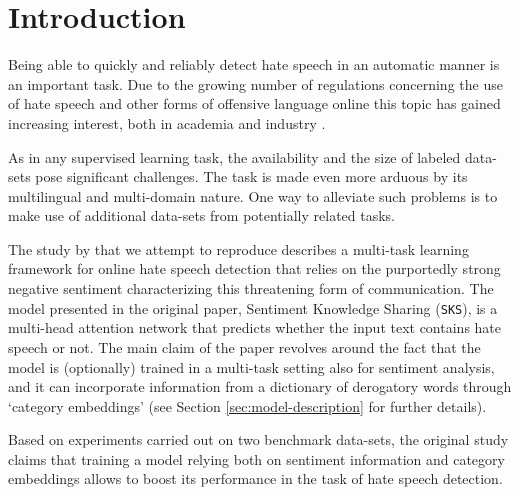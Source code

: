 \newpage



\section{Introduction}

Being able to quickly and reliably detect hate speech in an automatic manner is an important task.
Due to the growing number of regulations concerning the use of hate speech and other forms of offensive language online this topic has gained increasing interest, both in academia and industry \cite{davidson2017, Schmidt2017, basile:semeval, yin:arkaitz,zampieri2020}.

As in any supervised learning task, the availability and the size of labeled data-sets pose significant challenges. The task is made even more arduous by its multilingual and multi-domain nature. One way to alleviate such problems is to make use of additional data-sets from potentially related tasks.

The study by \citeauthor{original:zhou} that we attempt to reproduce describes a multi-task learning framework for online hate speech detection that relies on the purportedly strong negative sentiment characterizing this threatening form of communication. The model presented in the original paper, Sentiment Knowledge Sharing (\texttt{SKS}), is a multi-head attention network that predicts whether the input text contains hate speech or not. The main claim of the paper revolves around the fact that the model is (optionally) trained in a multi-task setting also for sentiment analysis, and it can incorporate information from a dictionary of derogatory words through `category embeddings' (see Section \ref{sec:model-description} for further details).

Based on experiments carried out on two benchmark data-sets, the original study claims that training a model relying both on sentiment information and category embeddings allows to boost its performance in the task of hate speech detection.




